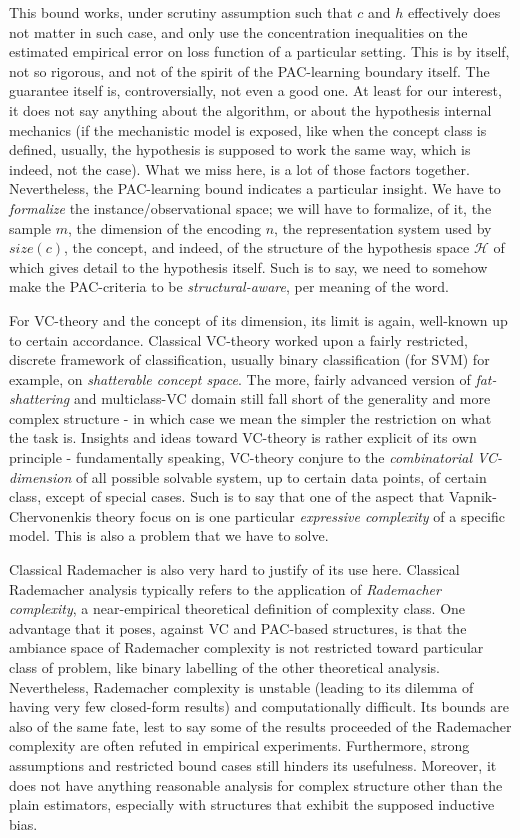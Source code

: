 This bound works, under scrutiny assumption such that $c$ and $h$ effectively does not matter in such case, and only use the concentration inequalities on the estimated empirical error on loss function of a particular setting. This is by itself, not so rigorous, and not of the spirit of the PAC-learning boundary itself. The guarantee itself is, controversially, not even a good one. At least for our interest, it does not say anything about the algorithm, or about the hypothesis internal mechanics (if the mechanistic model is exposed, like when the concept class is defined, usually, the hypothesis is supposed to work the same way, which is indeed, not the case). What we miss here, is a lot of those factors together. Nevertheless, the PAC-learning bound indicates a particular insight. We have to \textit{formalize} the instance/observational space; we will have to formalize, of it, the sample $m$, the dimension of the encoding $n$, the representation system used by $size(c)$, the concept, and indeed, of the structure of the hypothesis space $\mathcal{H}$ of which gives detail to the hypothesis itself. Such is to say, we need to somehow make the PAC-criteria to be \textit{structural-aware}, per meaning of the word. 

For VC-theory and the concept of its dimension, its limit is again, well-known up to certain accordance. Classical VC-theory worked upon a fairly restricted, discrete framework of classification, usually binary classification (for SVM) for example, on \textit{shatterable concept space}. The more, fairly advanced version of \textit{fat-shattering} and multiclass-VC domain still fall short of the generality and more complex structure - in which case we mean the simpler the restriction on what the task is. Insights and ideas toward VC-theory is rather explicit of its own principle - fundamentally speaking, VC-theory conjure to the \textit{combinatorial VC-dimension} of all possible solvable system, up to certain data points, of certain class, except of special cases. Such is to say that one of the aspect that Vapnik-Chervonenkis theory focus on is one particular \textit{expressive complexity} of a specific model. This is also a problem that we have to solve. 

Classical Rademacher is also very hard to justify of its use here. Classical Rademacher analysis typically refers to the application of \textit{Rademacher complexity}, a near-empirical theoretical definition of complexity class. One advantage that it poses, against VC and PAC-based structures, is that the ambiance space of Rademacher complexity is not restricted toward particular class of problem, like binary labelling of the other theoretical analysis. Nevertheless, Rademacher complexity is unstable (leading to its dilemma of having very few closed-form results) and computationally difficult. Its bounds are also of the same fate, lest to say some of the results proceeded of the Rademacher complexity are often refuted in empirical experiments. Furthermore, strong assumptions and restricted bound cases still hinders its usefulness. Moreover, it does not have anything reasonable analysis for complex structure other than the plain estimators, especially with structures that exhibit the supposed inductive bias. 

